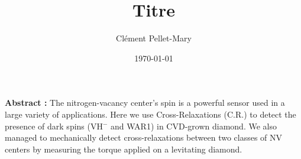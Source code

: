 \documentclass[a4paper]{article}
\title{Titre}
\author{Clément Pellet-Mary}
\date\today
\begin{document}
\centering
\textbf{Abstract :} The nitrogen-vacancy center's spin is a powerful sensor used in a large variety of applications. Here we use Cross-Relaxations (C.R.) to detect the presence of dark spins (VH$^-$ and WAR1) in CVD-grown diamond. We also managed to mechanically detect cross-relaxations between two classes of NV centers by measuring the torque applied on a levitating diamond.
  
\end{document}
